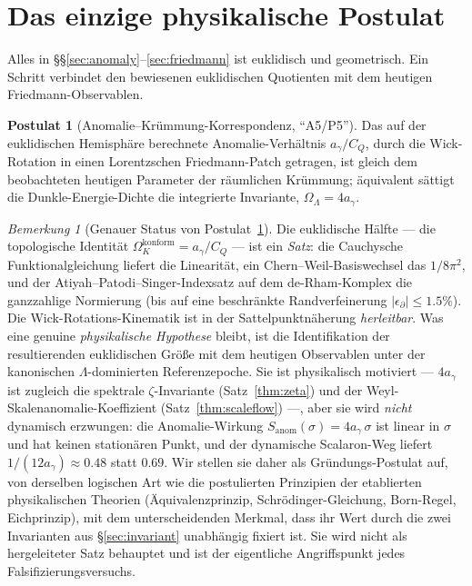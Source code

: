 \documentclass[11pt,a4paper]{article}
\theoremstyle{definition}
\newtheorem{postulate}{Postulat}
\theoremstyle{remark}
\newtheorem{remark}{Bemerkung}
\newcommand{\ag}{a_\gamma}
\newcommand{\CQ}{C_Q}
\newcommand{\Ok}{\Omega_K}
\newcommand{\OL}{\Omega_\Lambda}
\begin{document}
\section{Das einzige physikalische Postulat}\label{sec:postulate}
Alles in \S\S\ref{sec:anomaly}--\ref{sec:friedmann} ist euklidisch und geometrisch. Ein Schritt
verbindet den bewiesenen euklidischen Quotienten mit dem heutigen Friedmann-Observablen.

\begin{postulate}[Anomalie--Krümmung-Korrespondenz, ``A5/P5'']\label{post:A5}
Das auf der euklidischen Hemisphäre berechnete Anomalie-Verhältnis $\ag/\CQ$, durch die
Wick-Rotation in einen Lorentzschen Friedmann-Patch getragen, ist gleich dem beobachteten heutigen
Parameter der räumlichen Krümmung; äquivalent sättigt die Dunkle-Energie-Dichte die integrierte
Invariante, $\OL=4\ag$.
\end{postulate}

\begin{remark}[Genauer Status von Postulat~\ref{post:A5}]
Die euklidische Hälfte --- die topologische Identität $\Ok^{\mathrm{konform}}=\ag/\CQ$ --- ist ein
\emph{Satz}: die Cauchysche Funktionalgleichung liefert die Linearität, ein Chern--Weil-Basiswechsel
das $1/8\pi^2$, und der Atiyah--Patodi--Singer-Indexsatz auf dem de-Rham-Komplex die ganzzahlige
Normierung (bis auf eine beschränkte Randverfeinerung
$\lvert\epsilon_\partial\rvert\le1.5\%$). Die Wick-Rotations-Kinematik ist in der
Sattelpunktnäherung \emph{herleitbar}. Was eine genuine \emph{physikalische Hypothese} bleibt, ist
die Identifikation der resultierenden euklidischen Größe mit dem heutigen Observablen unter der
kanonischen $\Lambda$-dominierten Referenzepoche. Sie ist physikalisch motiviert --- $4\ag$ ist
zugleich die spektrale $\zeta$-Invariante (Satz~\ref{thm:zeta}) und der
Weyl-Skalenanomalie-Koeffizient (Satz~\ref{thm:scaleflow}) ---, aber sie wird \emph{nicht}
dynamisch erzwungen: die Anomalie-Wirkung $S_{\mathrm{anom}}(\sigma)=4\ag\,\sigma$ ist linear in
$\sigma$ und hat keinen stationären Punkt, und der dynamische Scalaron-Weg liefert
$1/(12\ag)\approx0.48$ statt $0.69$. Wir stellen sie daher als Gründungs-Postulat auf, von derselben
logischen Art wie die postulierten Prinzipien der etablierten physikalischen Theorien
(Äquivalenzprinzip, Schrödinger-Gleichung, Born-Regel, Eichprinzip), mit dem unterscheidenden
Merkmal, dass ihr Wert durch die zwei Invarianten aus \S\ref{sec:invariant} unabhängig fixiert
ist. Sie wird nicht als hergeleiteter Satz behauptet und ist der eigentliche Angriffspunkt jedes
Falsifizierungsversuchs.
\end{remark}
\end{document}
